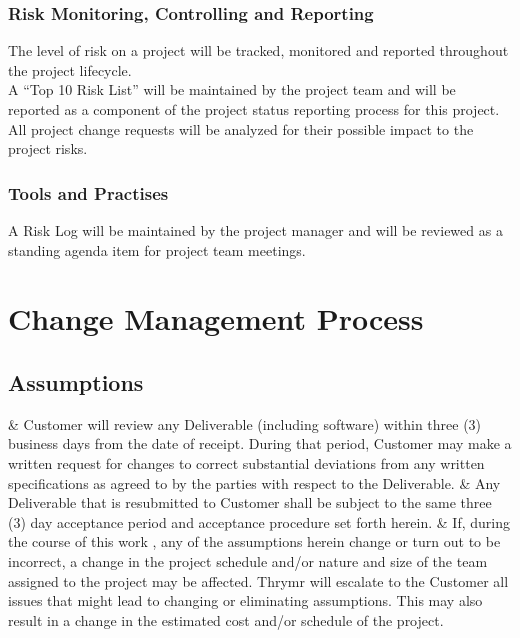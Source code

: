 \documentclass[a4paper]{article}
\begin{document}
    \subsubsection{Risk Monitoring, Controlling and Reporting}
    The level of risk on a project will be tracked, monitored and reported throughout the project lifecycle.  \\ 
    A “Top 10 Risk List” will be maintained by the project team and will be reported as a component of the project status reporting process for this project.  \\ 
    All project change requests will be analyzed for their possible impact to the project risks.\\
    
    \subsubsection{Tools and Practises}
    A Risk Log will be maintained by the project manager and will be reviewed as a standing agenda item for project team meetings.
    \newpage
    
    \section{Change Management Process}
    \subsection{Assumptions}
        \begin{easylist}
        	& \thinspace Customer will review any Deliverable (including software) within three (3) business days from the date of receipt. During that period, Customer may make a written request for changes to correct substantial deviations from any written specifications as agreed to by the parties with respect to the Deliverable.
        	& \thinspace  Any Deliverable that is resubmitted to Customer shall be subject to the same three (3) day acceptance period and acceptance procedure set forth herein.
        	& \thinspace If, during the course of this work , any of the assumptions herein change or turn out to be incorrect, a change in the project schedule and/or nature and size of the team assigned to the project may be affected. Thrymr will escalate to the Customer all issues that might lead to changing or eliminating assumptions. This may also result in a change in the estimated cost and/or schedule of the project. 
        \end{easylist}
        
\end{document}
